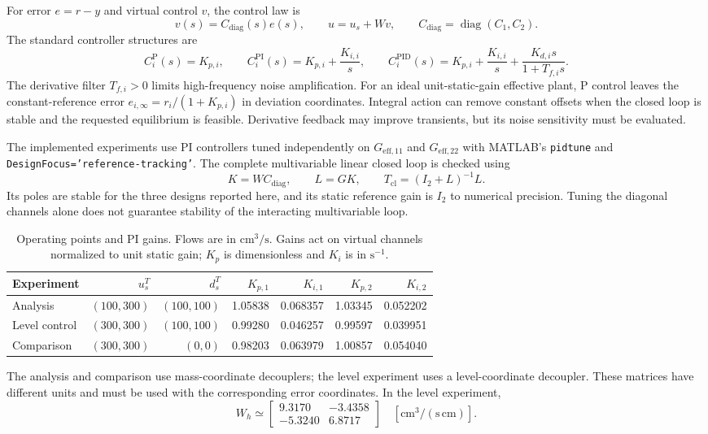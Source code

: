 For error $e=r-y$ and virtual control $v$, the control law is
\begin{equation}
 v(s)=C_{\mathrm{diag}}(s)e(s),\qquad
 u=u_s+Wv,\qquad C_{\mathrm{diag}}=\operatorname{diag}(C_1,C_2).
\end{equation}
The standard controller structures are
\begin{equation}
 C_i^{\mathrm P}(s)=K_{p,i},\qquad
 C_i^{\mathrm{PI}}(s)=K_{p,i}+\frac{K_{i,i}}{s},\qquad
 C_i^{\mathrm{PID}}(s)=K_{p,i}+\frac{K_{i,i}}{s}
                       +\frac{K_{d,i}s}{1+T_{f,i}s}.
\end{equation}
The derivative filter $T_{f,i}>0$ limits high-frequency noise amplification.
For an ideal unit-static-gain effective plant, P control leaves the
constant-reference error $e_{i,\infty}=r_i/(1+K_{p,i})$ in deviation
coordinates. Integral action can remove constant offsets when the closed
loop is stable and the requested equilibrium is feasible. Derivative
feedback may improve transients, but its noise sensitivity must be evaluated.

The implemented experiments use PI controllers tuned independently on
$G_{\mathrm{eff},11}$ and $G_{\mathrm{eff},22}$ with MATLAB's
\texttt{pidtune} and \texttt{DesignFocus='reference-tracking'}.
The complete multivariable linear closed loop is checked using
\begin{equation}
 K=WC_{\mathrm{diag}},\qquad L=GK,\qquad
 T_{\mathrm{cl}}=(I_2+L)^{-1}L.
\end{equation}
Its poles are stable for the three designs reported here, and its static
reference gain is $I_2$ to numerical precision. Tuning the diagonal channels
alone does not guarantee stability of the interacting multivariable loop.

\begin{table}[htbp]
 \centering
 \caption{Operating points and PI gains. Flows are in $\mathrm{cm^3/s}$.
 Gains act on virtual channels normalized to unit static gain; $K_p$ is
 dimensionless and $K_i$ is in $\mathrm{s^{-1}}$.}
 \label{tab:p3-gains}
 \begin{tabular}{lrrrrrr}
 \hline
 Experiment & $u_s^T$ & $d_s^T$ & $K_{p,1}$ & $K_{i,1}$ & $K_{p,2}$ & $K_{i,2}$\\
 \hline
 Analysis & $(100,300)$ & $(100,100)$ & 1.05838 & 0.068357 & 1.03345 & 0.052202\\
 Level control & $(300,300)$ & $(100,100)$ & 0.99280 & 0.046257 & 0.99597 & 0.039951\\
 Comparison & $(300,300)$ & $(0,0)$ & 0.98203 & 0.063979 & 1.00857 & 0.054040\\
 \hline
 \end{tabular}
\end{table}
The analysis and comparison use mass-coordinate decouplers; the level
experiment uses a level-coordinate decoupler. These matrices have different
units and must be used with the corresponding error coordinates. In the
level experiment,
\begin{equation}
 W_h\simeq\begin{bmatrix}9.3170&-3.4358\\-5.3240&6.8717\end{bmatrix}
 \quad [\mathrm{cm^3/(s\,cm)}].
\end{equation}

